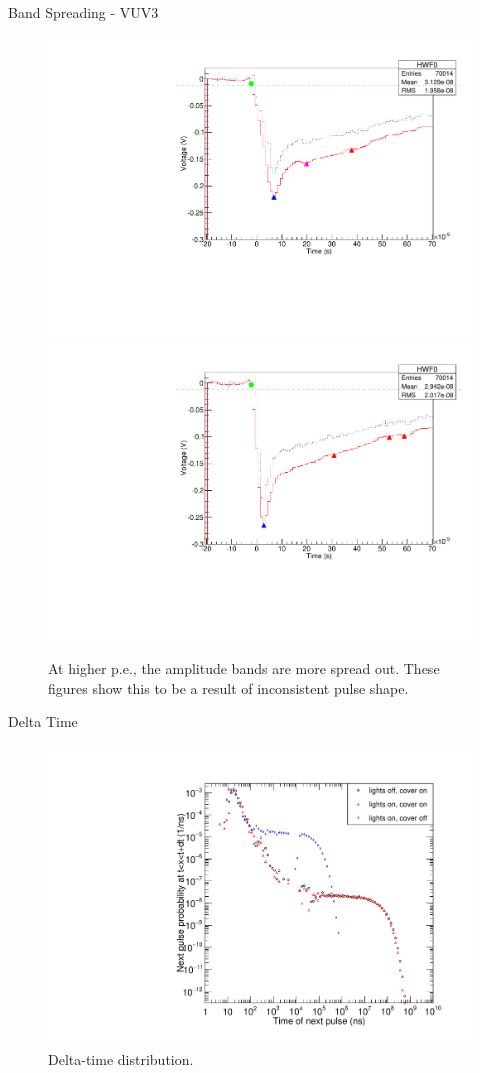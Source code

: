 \documentclass{beamer}
\begin{document}
\begin{frame}{Band Spreading - VUV3}
\begin{figure}
\centering
\includegraphics[height=0.38\textwidth]{peak_low.pdf}%
\includegraphics[height=0.38\textwidth]{peak_high.pdf}
\caption{At higher p.e., the amplitude bands are more spread out. These figures show this to be a result of inconsistent pulse shape.}
\end{figure}
\end{frame}

\begin{frame}{Delta Time}
\begin{figure}
\centering
\includegraphics[height=0.5\textwidth]{LightLeak.pdf}
\caption{Delta-time distribution.}
\end{figure}
\end{frame}
\end{document}
